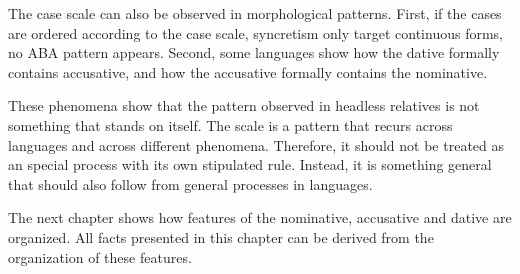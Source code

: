 The case scale can also be observed in morphological patterns. First, if the cases are ordered according to the case scale, syncretism only target continuous forms, no ABA pattern appears. Second, some languages show how the dative formally contains accusative, and how the accusative formally contains the nominative.

These phenomena show that the pattern observed in headless relatives is not something that stands on itself. The scale is a pattern that recurs across languages and across different phenomena. Therefore, it should not be treated as an special process with its own stipulated rule. Instead, it is something general that should also follow from general processes in languages.

The next chapter shows how features of the nominative, accusative and dative are organized. All facts presented in this chapter can be derived from the organization of these features.
